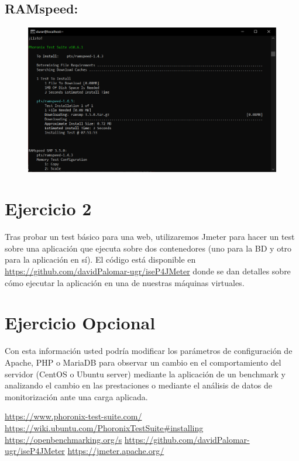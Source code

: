 \documentclass[a4paper]{article}
\begin{document}
\subsection*{\textbf{RAMspeed:}}
\begin{figure}[hbt!]
    \centering
    \includegraphics[width=\textwidth]{ramspeed Centos1.png}
\end{figure}
\newpage
\section{Ejercicio 2}
Tras probar un test básico para una web, utilizaremos Jmeter para hacer 
un test sobre una aplicación que ejecuta sobre dos contenedores (uno
para la BD y otro para la aplicación en sí). El código está disponible en 
\href{https://github.com/davidPalomar-ugr/iseP4JMeter}{https://github.com/davidPalomar-ugr/iseP4JMeter}
donde se dan detalles sobre cómo ejecutar la aplicación en una de nuestras máquinas virtuales.


\section{Ejercicio Opcional}
Con esta información usted podría modificar los parámetros
de configuración de Apache, PHP o MariaDB para observar un cambio en el
comportamiento del servidor (CentOS o Ubuntu server) mediante la aplicación
de un benchmark y analizando el cambio en las prestaciones o mediante el análisis
de datos de monitorización ante una carga aplicada.

\newpage
\begin{thebibliography}{99}
    \href{https://www.phoronix-test-suite.com/}{https://www.phoronix-test-suite.com/}
    \href{https://wiki.ubuntu.com/PhoronixTestSuite#installing}{https://wiki.ubuntu.com/PhoronixTestSuite\#installing}
    \href{https://openbenchmarking.org/s}{https://openbenchmarking.org/s}
    \href{https://github.com/davidPalomar-ugr/iseP4JMeter}{https://github.com/davidPalomar-ugr/iseP4JMeter}
    \href{https://jmeter.apache.org/}{https://jmeter.apache.org/}
    \bibitem[]{} 
    \href{}{}
\end{thebibliography}
\end{document}
